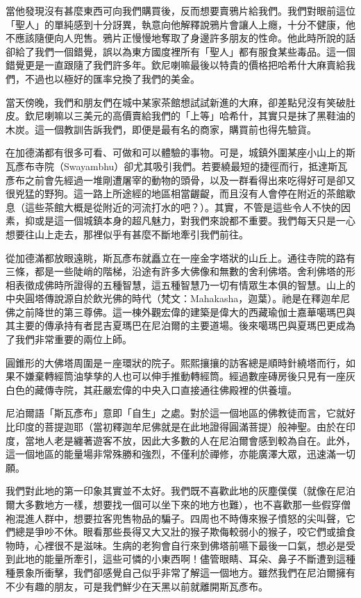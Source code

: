 當他發現沒有甚麼東西可向我們購買後，反而想要賣鴉片給我們。我們對眼前這位「聖人」的單純感到十分訝異，執意向他解釋說鴉片會讓人上癮，十分不健康，他不應該隨便向人兜售。鴉片正慢慢地奪取了身邊許多朋友的性命。他此時所說的話卻給了我們一個錯覺，誤以為東方國度裡所有「聖人」都有服食某些毒品。這一個錯覺更是一直跟隨了我們許多年。欽尼喇嘛最後以特貴的價格把哈希什大麻賣給我們，不過也以極好的匯率兌換了我們的美金。

當天傍晚，我們和朋友們在城中某家茶館想試試新進的大麻，卻差點兒沒有笑破肚皮。欽尼喇嘛以三美元的高價賣給我們的「上等」哈希什，其實只是抹了黑鞋油的木炭。這一個教訓告訴我們，即便是最有名的商家，購買前也得先驗貨。

在加德滿都有很多可看、可做和可以體驗的事物。可是，城鎮外圍某座小山上的斯瓦彥布寺院（Swayambhu）卻尤其吸引我們。若要繞最短的捷徑而行，抵達斯瓦彥布之前會先經過一堆剛遭屠宰的動物的頭骨，以及一群看得出來吃得好可是卻又很兇猛的野狗。這一路上所途經的地區相當齷齪，而且沒有人會停在附近的茶館歇息（這些茶館大概是從附近的河流打水的吧？）。其實，不管是這些令人不快的因素，抑或是這一個城鎮本身的超凡魅力，對我們來說都不重要。我們每天只是一心想要往山上走去，那裡似乎有甚麼不斷地牽引我們前往。

從加德滿都放眼遠眺，斯瓦彥布就矗立在一座金字塔狀的山丘上。通往寺院的路有三條，都是一些陡峭的階梯，沿途有許多大佛像和無數的舍利佛塔。舍利佛塔的形相表徵成佛時所證得的五種智慧，這五種智慧乃一切有情眾生本俱的智慧。山上的中央圓塔傳說源自於飲光佛的時代（梵文：Mahakasha，迦葉）。祂是在釋迦牟尼佛之前降世的第三尊佛。這一棟外觀宏偉的建築是偉大的西藏瑜伽士嘉華噶瑪巴與其主要的傳承持有者昆吉夏瑪巴在尼泊爾的主要道場。後來噶瑪巴與夏瑪巴更成為了我們非常重要的兩位上師。

圓錐形的大佛塔周圍是ㄧ座環狀的院子。熙熙攘攘的訪客總是順時針繞塔而行，如果不嫌棄轉經筒油孳孳的人也可以伸手推動轉經筒。經過數座磚房後只見有一座灰白色的藏傳寺院，其莊嚴宏偉的中央入口直接通往佛殿裡的供養壇。

尼泊爾語「斯瓦彥布」意即「自生」之處。對於這一個地區的佛教徒而言，它就好比印度的菩提迦耶（當初釋迦牟尼佛就是在此地證得圓滿菩提）般神聖。由於在印度，當地人老是纏著遊客不放，因此大多數的人在尼泊爾會感到較為自在。此外，這一個地區的能量場非常殊勝和強烈，不僅利於禪修，亦能廣澤大眾，迅速滿一切願。

我們對此地的第一印象其實並不太好。我們既不喜歡此地的灰塵僕僕（就像在尼泊爾大多數地方一樣，想要找一個可以坐下來的地方也難），也不喜歡那一些假穿僧袍混進人群中，想要拉客兜售物品的騙子。四周也不時傳來猴子憤怒的尖叫聲，它們總是爭吵不休。眼看那些長得又大又壯的猴子欺侮較弱小的猴子，咬它們或搶食物時，心裡很不是滋味。生病的老狗會自行來到佛塔前嚥下最後一口氣，想必是受到此地的能量所牽引，這些可憐的小東西啊！儘管眼睛、耳朵、鼻子不斷遭到這種種景象所衝擊，我們卻感覺自己似乎非常了解這一個地方。雖然我們在尼泊爾擁有不少有趣的朋友，可是我們鮮少在天黑以前就離開斯瓦彥布。

